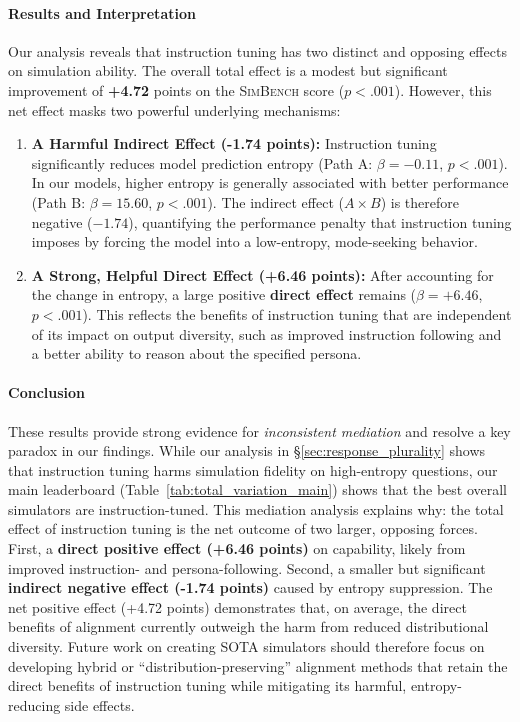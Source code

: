 \documentclass{article} %
\begin{document}
\paragraph{Results and Interpretation} Our analysis reveals that instruction tuning has two distinct and opposing effects on simulation ability. The overall total effect is a modest but significant improvement of \textbf{+4.72} points on the \textsc{SimBench} score ($p < .001$). However, this net effect masks two powerful underlying mechanisms:

\begin{enumerate}
    \item \textbf{A Harmful Indirect Effect (-1.74 points):} Instruction tuning significantly reduces model prediction entropy (Path A: $\beta = -0.11$, $p < .001$). In our models, higher entropy is generally associated with better performance (Path B: $\beta = 15.60$, $p < .001$). The indirect effect ($A \times B$) is therefore negative ($-1.74$), quantifying the performance penalty that instruction tuning imposes by forcing the model into a low-entropy, mode-seeking behavior.

    \item \textbf{A Strong, Helpful Direct Effect (+6.46 points):} After accounting for the change in entropy, a large positive \textbf{direct effect} remains ($\beta = +6.46$, $p < .001$). This reflects the benefits of instruction tuning that are independent of its impact on output diversity, such as improved instruction following and a better ability to reason about the specified persona.
\end{enumerate}

\paragraph{Conclusion} These results provide strong evidence for \textit{inconsistent mediation} and resolve a key paradox in our findings. While our analysis in \S\ref{sec:response_plurality} shows that instruction tuning harms simulation fidelity on high-entropy questions, our main leaderboard (Table~\ref{tab:total_variation_main}) shows that the best overall simulators are instruction-tuned. This mediation analysis explains why: the total effect of instruction tuning is the net outcome of two larger, opposing forces. First, a \textbf{direct positive effect (+6.46 points)} on capability, likely from improved instruction- and persona-following. Second, a smaller but significant \textbf{indirect negative effect (-1.74 points)} caused by entropy suppression. The net positive effect (+4.72 points) demonstrates that, on average, the direct benefits of alignment currently outweigh the harm from reduced distributional diversity. Future work on creating SOTA simulators should therefore focus on developing hybrid or ``distribution-preserving'' alignment methods that retain the direct benefits of instruction tuning while mitigating its harmful, entropy-reducing side effects.
\end{document}
